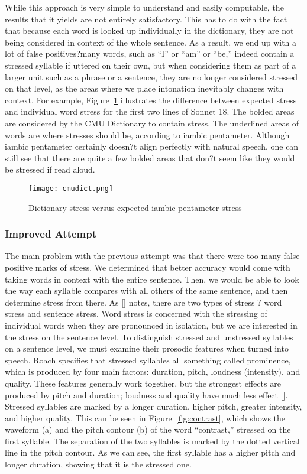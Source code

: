 \documentclass[pageno]{jpaper}
\newcommand{\quotes}[1]{``#1''}
\begin{document}
While this approach is very simple to understand and easily computable, the results that it yields are not entirely satisfactory. This has to do with the fact that because each word is looked up individually in the dictionary, they are not being considered in context of the whole sentence. As a result, we end up with a lot of false positives?many words, such as \quotes{I} or  \quotes{am} or  \quotes{be,} indeed contain a stressed syllable if uttered on their own, but when considering them as part of a larger unit such as a phrase or a sentence, they are no longer considered stressed on that level, as the areas where we place intonation inevitably changes with context. For example, Figure~\ref{fig:cmudict} illustrates the difference between expected stress and individual word stress for the first two lines of Sonnet 18. The bolded areas are considered by the CMU Dictionary to contain stress. The underlined areas of words are where stresses should be, according to iambic pentameter. Although iambic pentameter certainly doesn?t align perfectly with natural speech, one can still see that there are quite a few bolded areas that don?t seem like they would be stressed if read aloud.

\begin{figure}[hbt]
\centering
\texttt{[image: cmudict.png]}
\caption{Dictionary stress versus expected iambic pentameter stress}
\label{fig:cmudict}
\end{figure}

\subsubsection{Improved Attempt}
The main problem with the previous attempt was that there were too many false-positive marks of stress. We determined that better accuracy would come with taking words in context with the entire sentence. Then, we would be able to look the way each syllable compares with all others of the same sentence, and then determine stress from there. As [] notes, there are two types of stress ? word stress and sentence stress. Word stress is concerned with the stressing of individual words when they are pronounced in isolation, but we are interested in the stress on the sentence level. To distinguish stressed and unstressed syllables on a sentence level, we must examine their prosodic features when turned into speech. Roach specifies that stressed syllables all something called prominence, which is produced by four main factors:  duration, pitch, loudness (intensity), and quality. These features generally work together, but the strongest effects are produced by pitch and duration; loudness and quality have much less effect []. Stressed syllables are marked by a longer duration, higher pitch, greater intensity, and higher quality. This can be seen in Figure~\ref{fig:contrast}, which shows the waveform (a) and the pitch contour (b) of the word \quotes{contrast,} stressed on the first syllable. The separation of the two syllables is marked by the dotted vertical line in the pitch contour. As we can see, the first syllable has a higher pitch and longer duration, showing that it is the stressed one. 
\end{document}
